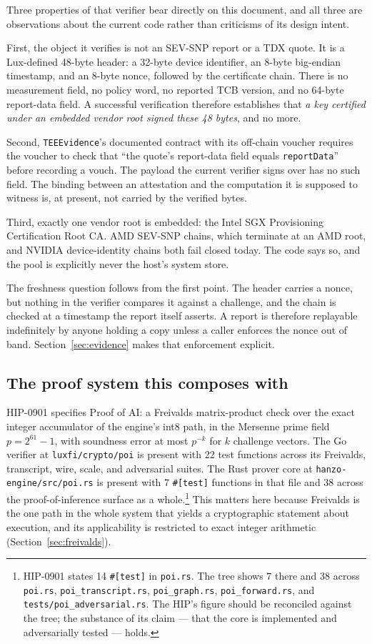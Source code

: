 \documentclass[11pt]{article}
\newcommand{\code}[1]{\texttt{#1}}
\begin{document}
Three properties of that verifier bear directly on this document, and all three are observations
about the current code rather than criticisms of its design intent.

First, the object it verifies is not an SEV-SNP report or a TDX quote. It is a Lux-defined 48-byte
header: a 32-byte device identifier, an 8-byte big-endian timestamp, and an 8-byte nonce, followed
by the certificate chain. There is no measurement field, no policy word, no reported TCB version,
and no 64-byte report-data field. A successful verification therefore establishes that \emph{a key
certified under an embedded vendor root signed these 48 bytes}, and no more.

Second, \code{TEEEvidence}'s documented contract with its off-chain voucher requires the voucher to
check that ``the quote's report-data field equals \code{reportData}'' before recording a vouch. The
payload the current verifier signs over has no such field. The binding between an attestation and
the computation it is supposed to witness is, at present, not carried by the verified bytes.

Third, exactly one vendor root is embedded: the Intel SGX Provisioning Certification Root CA. AMD
SEV-SNP chains, which terminate at an AMD root, and NVIDIA device-identity chains both fail closed
today. The code says so, and the pool is explicitly never the host's system store.

The freshness question follows from the first point. The header carries a nonce, but nothing in the
verifier compares it against a challenge, and the chain is checked at a timestamp the report itself
asserts. A report is therefore replayable indefinitely by anyone holding a copy unless a caller
enforces the nonce out of band. Section~\ref{sec:evidence} makes that enforcement explicit.

\subsection{The proof system this composes with}

HIP-0901 specifies Proof of AI: a Freivalds \cite{freivalds1977} matrix-product check over the exact integer accumulator
of the engine's int8 path, in the Mersenne prime field $p = 2^{61}-1$, with soundness error at most
$p^{-k}$ for $k$ challenge vectors. The Go verifier at \code{luxfi/crypto/poi} is present with 22
test functions across its Freivalds, transcript, wire, scale, and adversarial suites. The Rust
prover core at \code{hanzo-engine/src/poi.rs} is present with 7 \code{\#[test]} functions in that
file and 38 across the proof-of-inference surface as a whole.\footnote{HIP-0901 states 14
\code{\#[test]} in \code{poi.rs}. The tree shows 7 there and 38 across \code{poi.rs},
\code{poi\_transcript.rs}, \code{poi\_graph.rs}, \code{poi\_forward.rs}, and
\code{tests/poi\_adversarial.rs}. The HIP's figure should be reconciled against the tree; the
substance of its claim --- that the core is implemented and adversarially tested --- holds.} This
matters here because Freivalds is the one path in the whole system that yields a cryptographic
statement about execution, and its applicability is restricted to exact integer arithmetic
(Section~\ref{sec:freivalds}).
\end{document}
